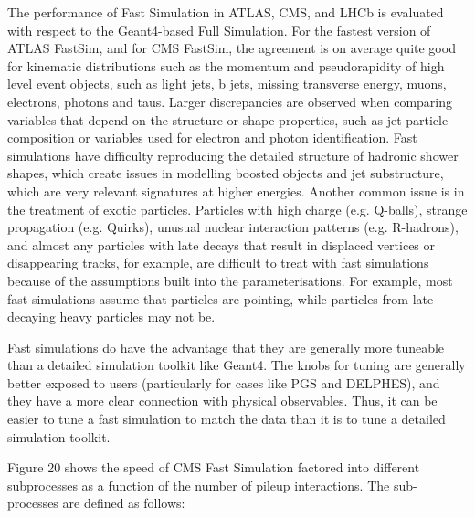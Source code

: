 \documentclass[12pt,a4paper]{article}
\begin{document}
{The performance of Fast Simulation in ATLAS, CMS, and LHCb is evaluated
with respect to the Geant4-based Full Simulation. For the fastest
version of ATLAS FastSim, and for CMS FastSim, the agreement is on
average quite good for kinematic distributions such as the momentum and
pseudorapidity of high level event objects, such as light jets, b jets,
missing transverse energy, muons, electrons, photons and taus. Larger
discrepancies are observed when comparing variables that depend on the
structure or shape properties, such as jet particle composition or
variables used for electron and photon identification. Fast simulations
have difficulty reproducing the detailed structure of hadronic shower
shapes, which create issues in modelling boosted objects and jet
substructure, which are very relevant signatures at higher energies.
Another common issue is in the treatment of exotic particles. Particles
with high charge (e.g. Q-balls), strange propagation (e.g. Quirks),
unusual nuclear interaction patterns (e.g. R-hadrons), and almost any
particles with late decays that result in displaced vertices or
disappearing tracks, for example, are difficult to treat with fast
simulations because of the assumptions built into the parameterisations.
For example, most fast simulations assume that particles are pointing,
while particles from late-decaying heavy particles may not be.

Fast simulations do have the advantage that they are generally more
tuneable than a detailed simulation toolkit like Geant4. The knobs for
tuning are generally better exposed to users (particularly for cases
like PGS and DELPHES), and they have a more clear connection with
physical observables. Thus, it can be easier to tune a fast simulation
to match the data than it is to tune a detailed simulation toolkit.

Figure 20 shows the speed of CMS Fast Simulation factored into different
subprocesses as a function of the number of pileup interactions. The
sub-processes are defined as follows:

}
\end{document}
